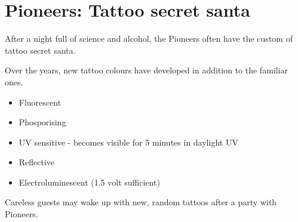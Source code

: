 \section{Pioneers: Tattoo secret santa}

After a night full of science and alcohol, the Pioneers often have the custom of tattoo secret santa.

Over the years, new tattoo colours have developed in addition to the familiar ones.

\begin{itemize}
    \item Fluorescent
    \item Phosporising
    \item UV sensitive - becomes visible for 5 minutes in daylight UV
    \item Reflective
    \item Electroluminescent (1.5 volt sufficient)
\end{itemize}

Careless guests may wake up with new, random tattoos after a party with Pioneers.




